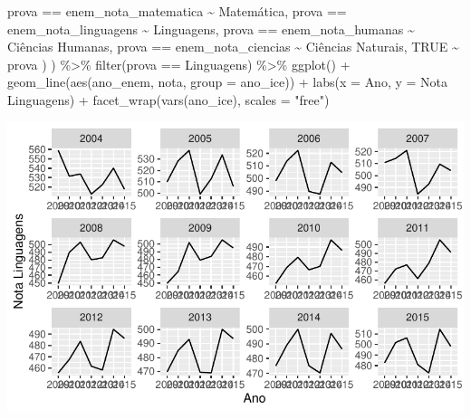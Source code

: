 \documentclass[
  letterpaper,
  DIV=11,
  numbers=noendperiod]{scrartcl}
\newenvironment{Shaded}{\begin{snugshade}}{\end{snugshade}}
\newcommand{\AttributeTok}[1]{\textcolor[rgb]{0.40,0.45,0.13}{#1}}
\newcommand{\ConstantTok}[1]{\textcolor[rgb]{0.56,0.35,0.01}{#1}}
\newcommand{\FunctionTok}[1]{\textcolor[rgb]{0.28,0.35,0.67}{#1}}
\newcommand{\NormalTok}[1]{\textcolor[rgb]{0.00,0.23,0.31}{#1}}
\newcommand{\SpecialCharTok}[1]{\textcolor[rgb]{0.37,0.37,0.37}{#1}}
\newcommand{\StringTok}[1]{\textcolor[rgb]{0.13,0.47,0.30}{#1}}
\begin{document}
\begin{Shaded}
\begin{Highlighting}[]
\NormalTok{      prova }\SpecialCharTok{==} \StringTok{\textquotesingle{}enem\_nota\_matematica\textquotesingle{}} \SpecialCharTok{\textasciitilde{}} \StringTok{\textquotesingle{}Matemática\textquotesingle{}}\NormalTok{,}
\NormalTok{      prova }\SpecialCharTok{==} \StringTok{\textquotesingle{}enem\_nota\_linguagens\textquotesingle{}} \SpecialCharTok{\textasciitilde{}} \StringTok{\textquotesingle{}Linguagens\textquotesingle{}}\NormalTok{,}
\NormalTok{      prova }\SpecialCharTok{==} \StringTok{\textquotesingle{}enem\_nota\_humanas\textquotesingle{}} \SpecialCharTok{\textasciitilde{}} \StringTok{\textquotesingle{}Ciências Humanas\textquotesingle{}}\NormalTok{,}
\NormalTok{      prova }\SpecialCharTok{==} \StringTok{\textquotesingle{}enem\_nota\_ciencias\textquotesingle{}} \SpecialCharTok{\textasciitilde{}} \StringTok{\textquotesingle{}Ciências Naturais\textquotesingle{}}\NormalTok{,}
      \ConstantTok{TRUE} \SpecialCharTok{\textasciitilde{}}\NormalTok{ prova}
\NormalTok{    )}
\NormalTok{  ) }\SpecialCharTok{\%\textgreater{}\%}
  \FunctionTok{filter}\NormalTok{(prova }\SpecialCharTok{==} \StringTok{\textquotesingle{}Linguagens\textquotesingle{}}\NormalTok{) }\SpecialCharTok{\%\textgreater{}\%} 
  \FunctionTok{ggplot}\NormalTok{() }\SpecialCharTok{+}
  \FunctionTok{geom\_line}\NormalTok{(}\FunctionTok{aes}\NormalTok{(ano\_enem, nota, }\AttributeTok{group =}\NormalTok{ ano\_ice)) }\SpecialCharTok{+}
  \FunctionTok{labs}\NormalTok{(}\AttributeTok{x =} \StringTok{\textquotesingle{}Ano\textquotesingle{}}\NormalTok{, }\AttributeTok{y =} \StringTok{\textquotesingle{}Nota Linguagens\textquotesingle{}}\NormalTok{) }\SpecialCharTok{+}
  \FunctionTok{facet\_wrap}\NormalTok{(}\FunctionTok{vars}\NormalTok{(ano\_ice), }\AttributeTok{scales =} \StringTok{"free"}\NormalTok{)}
\end{Highlighting}
\end{Shaded}

\includegraphics{script_files/figure-latex/unnamed-chunk-11-4.pdf}
\end{document}

